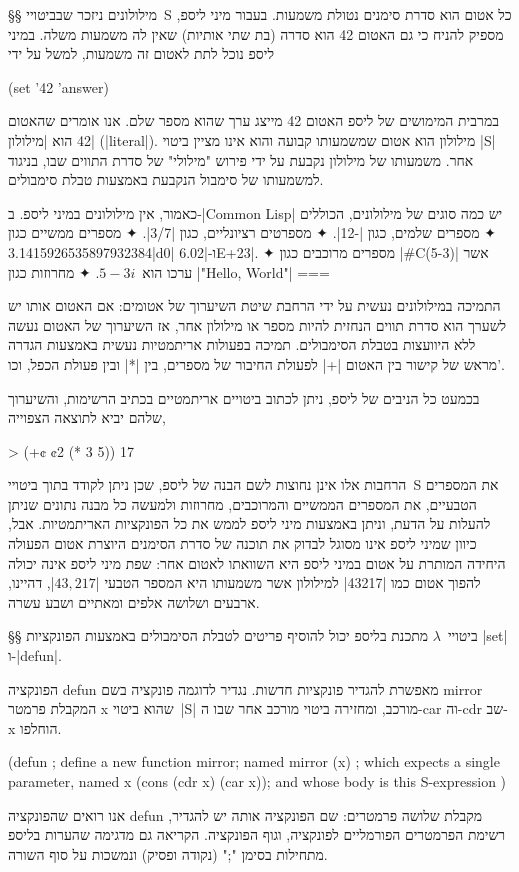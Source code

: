 §§ מילולונים
ניזכר שבביטויי~S כל אטום הוא סדרת סימנים נטולת משמעות. בעבור מיני ליספ,
מספיק להניח כי גם האטום 42 הוא סדרה (בת שתי אותיות) שאין לה משמעות משלה.
במיני ליספ נוכל לתת לאטום זה משמעות, למשל על ידי
\begin{LISP}
(set '42 'answer)
\end{LISP}
במרבית המימושים של ליספ האטום 42 מייצג ערך שהוא מספר
שלם. אנו אומרים שהאטום 42 הוא \ע|מילולון| (\E|literal|). מילולון הוא
אטום שמשמעותו קבועה והוא אינו מציין ביטוי \E|S| אחר. משמעותו של מילולון
נקבעת על ידי פירוש "מילולי" של סדרת התווים שבו, בניגוד למשמעותו של סימבול
הנקבעת באמצעות טבלת סימבולים.

כאמור, אין מילולונים במיני ליספ. ב-\E|Common Lisp| יש כמה סוגים של מילולונים,
הכוללים
✦ מספרים שלמים, כגון \T|-12|.
✦ מספרטים רציונליים, כגון \T|3/7|.
✦ מספרים ממשיים כגון \T|3.1415926535897932384d0| ו-\T|6.02E+23|.
✦ מספרים מרוכבים כגון \T|#C(5-3)| אשר ערכו הוא~$5-3i$.
✦ מחרוזות כגון \T|"Hello, World"|
===

התמיכה במילולונים נעשית על ידי הרחבת שיטת השיערוך של אטומים: אם האטום אותו יש
לשערך הוא סדרת תווים הנחזית להיות מספר או מילולון אחר, אז השיערוך של האטום נעשה
ללא היוועצות בטבלת הסימבולים. תמיכה בפעולות אריתמטיות נעשית באמצעות הגדרה מראש
של קישור בין האטום \T|+| לפעולת החיבור של מספרים, בין \T|*| ובין פעולת הכפל,
וכו'.

בכמעט כל הניבים של ליספ, ניתן לכתוב ביטויים אריתמטיים בכתיב הרשימות, והשיערוך
שלהם יביא לתוצאה הצפוייה,

\begin{LISP}
> (+¢ ¢2 (* 3 5))
17
\end{LISP}

הרחבות אלו אינן נחוצות לשם הבנה של ליספ, שכן ניתן לקודד בתוך ביטויי~S את
המספרים הטבעיים, את המספרים הממשיים והמרוכבים, מחרוזות ולמעשה כל מבנה נתונים
שניתן להעלות על הדעת, וניתן באמצעות מיני ליספ לממש את כל הפונקציות האריתמטיות.
אבל, כיוון שמיני ליספ אינו מסוגל לבדוק את תוכנה של סדרת הסימנים היוצרת אטום
הפעולה היחידה המותרת על אטום במיני ליספ היא השוואתו לאטום אחר: שפת מיני ליספ
אינה יכולה להפוך אטום כמו \T|43217| למילולון אשר משמעותו היא המספר הטבעי
\E|$43,217$|, דהיינו, ארבעים ושלושה אלפים ומאתיים ושבע עשרה.

§§ ביטויי~$λ$
מתכנת בליספ יכול להוסיף פריטים לטבלת הסימבולים באמצעות הפונקציות \E|set|
ו-\E|defun|.

הפונקציה defun מאפשרת להגדיר פונקציות חדשות. נגדיר לדוגמה פונקציה בשם mirror
המקבלת פרמטר x שהוא ביטוי~\E|S| מורכב, ומחזירה ביטוי מורכב אחר שבו ה-car וה-cdr
שב-x הוחלפו.
\begin{LISP}
(defun ; define a new function
  mirror; named mirror
  (x) ; which expects a single parameter, named x
  (cons (cdr x) (car x)); and whose body is this S-expression
)
\end{LISP}
אנו רואים שהפונקציה defun מקבלת שלושה פרמטרים: שם הפונקציה אותה יש להגדיר,
רשימת הפרמטרים הפורמליים לפונקציה, וגוף הפונקציה. הקריאה גם מדגימה שהערות בליספ
מתחילות בסימן ";" (נקודה ופסיק) ונמשכות על סוף השורה.

